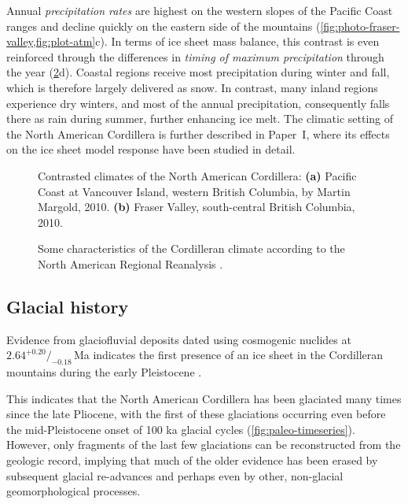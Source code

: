 \documentclass{article}
\newcommand{\CCLI}[0]{Paper~I}      %
\newcommand{\subgraphics}[3][,]{%
  \setbox1=\hbox{\texttt{[image: \#3]}}%
  \leavevmode\rlap{\usebox1}%
  \rlap{\hspace*{0.25em}
        \raisebox{\dimexpr\ht1-3ex}{\textbf{(#2)}}}%
  \phantom{\usebox1}%
}
\begin{document}
Annual \emph{precipitation rates} are highest on the western slopes of the
Pacific Coast ranges and decline quickly on the eastern side of the mountains
(\cref{fig:photo-fraser-valley,fig:plot-atm}c). In terms of ice sheet
mass balance, this contrast is even reinforced through the differences in
\emph{timing of maximum precipitation} through the year (\cref{fig:plot-atm}d).
Coastal regions receive most precipitation during winter and fall, which is
therefore largely delivered as snow. In contrast, many inland regions
experience dry winters, and most of the annual precipitation, consequently
falls there as rain during summer, further enhancing ice melt. The climatic
setting of the North American Cordillera is further described in \CCLI, where
its effects on the ice sheet model response have been studied in detail.

\begin{figure}
  \centering
  \makebox[0pt]{
    \subgraphics{a}{photo-vancouver-island}
    \hspace{1cm}
    \subgraphics{b}{photo-fraser-valley}
  }
  \caption{Contrasted climates of the North American Cordillera:
           \textbf{(a)} Pacific Coast at Vancouver Island, western British
           Columbia, by Martin Margold, 2010.
           \textbf{(b)} Fraser Valley, south-central British Columbia, 2010.}
  \label{fig:photo-fraser-valley}
\end{figure}

\begin{figure}
  \centering
  \caption{Some characteristics of the Cordilleran climate according to the
           North American Regional Reanalysis
           \citep[NARR,][]{Mesinger.etal.2006}.}
  \label{fig:plot-atm}
\end{figure}


\subsection{Glacial history}

Evidence from glaciofluvial deposits dated using cosmogenic nuclides at
$2.64^{+0.20}/_{-0.18}$\,Ma indicates the first presence of an ice sheet in the
Cordilleran mountains during the early Pleistocene \citep{Hidy.etal.2013}.

This indicates that the North American Cordillera has been glaciated many times
since the late Pliocene, with the first of these glaciations occurring even
before the mid-Pleistocene onset of 100 ka glacial cycles
(\cref{fig:paleo-timeseries}). However, only fragments of the last few
glaciations can be reconstructed from the geologic record, implying that much
of the older evidence has been erased by subsequent glacial re-advances and
perhaps even by other, non-glacial geomorphological processes.
\end{document}
